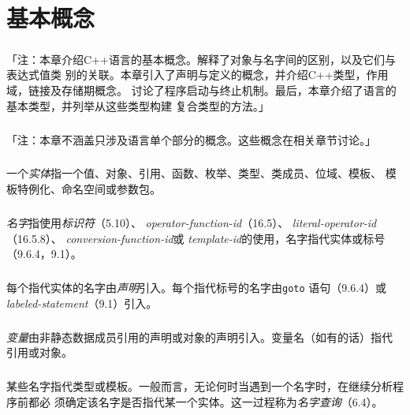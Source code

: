 \chapter{基本概念}

\paragraph{}
「注：本章介绍C++语言的基本概念。解释了对象与名字间的区别，以及它们与表达式值类
别的关联。本章引入了声明与定义的概念，并介绍C++类型，作用域，链接及存储期概念。
讨论了程序启动与终止机制。最后，本章介绍了语言的基本类型，并列举从这些类型构建
复合类型的方法。」

\paragraph{}
「注：本章不涵盖只涉及语言单个部分的概念。这些概念在相关章节讨论。」

\paragraph{}
一个\textit{实体}指一个值、对象、引用、函数、枚举、类型、类成员、位域、模板、
模板特例化、命名空间或参数包。

\paragraph{}
\textit{名字}指使用\textit{标识符}（5.10）、
\textit{operator-function-id}（16.5）、
\textit{literal-operator-id}（16.5.8）、
\textit{conversion-function-id}或
\textit{template-id}的使用，名字指代实体或标号（9.6.4，9.1）。

\paragraph{}
每个指代实体的名字由\textit{声明}引入。每个指代标号的名字由\texttt{goto}
语句（9.6.4）或\textit{labeled-statement}（9.1）引入。

\paragraph{}
\textit{变量}由非静态数据成员引用的声明或对象的声明引入。变量名（如有的话）指代
引用或对象。

\paragraph{}
某些名字指代类型或模板。一般而言，无论何时当遇到一个名字时，在继续分析程序前都必
须确定该名字是否指代某一个实体。这一过程称为\textit{名字查询}（6.4）。


